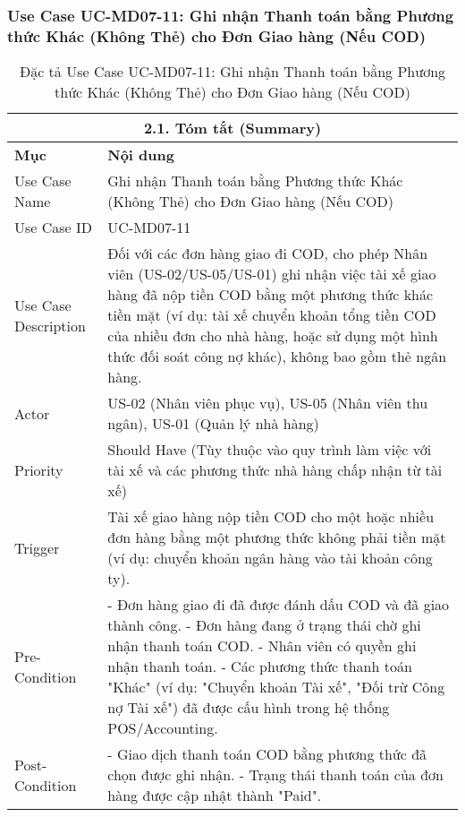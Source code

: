 \subsubsection{Use Case UC-MD07-11: Ghi nhận Thanh toán bằng Phương thức Khác (Không Thẻ) cho Đơn Giao hàng (Nếu COD)}
\begin{longtable}{|m{4cm}|p{11cm}|}
\caption{Đặc tả Use Case UC-MD07-11: Ghi nhận Thanh toán bằng Phương thức Khác (Không Thẻ) cho Đơn Giao hàng (Nếu COD)} \label{tab:uc_md07_11_final_full} \\
\hline
\multicolumn{2}{|c|}{\textbf{2.1. Tóm tắt (Summary)}} \\
\hline
\textbf{Mục} & \textbf{Nội dung} \\
\hline
\endhead %
\hline
\endfoot %
\hline
\endlastfoot %
Use Case Name & Ghi nhận Thanh toán bằng Phương thức Khác (Không Thẻ) cho Đơn Giao hàng (Nếu COD) \\
\hline
Use Case ID & UC-MD07-11 \\
\hline
Use Case Description & Đối với các đơn hàng giao đi COD, cho phép Nhân viên (US-02/US-05/US-01) ghi nhận việc tài xế giao hàng đã nộp tiền COD bằng một phương thức khác tiền mặt (ví dụ: tài xế chuyển khoản tổng tiền COD của nhiều đơn cho nhà hàng, hoặc sử dụng một hình thức đối soát công nợ khác), không bao gồm thẻ ngân hàng. \\
\hline
Actor & US-02 (Nhân viên phục vụ), US-05 (Nhân viên thu ngân), US-01 (Quản lý nhà hàng) \\
\hline
Priority & Should Have (Tùy thuộc vào quy trình làm việc với tài xế và các phương thức nhà hàng chấp nhận từ tài xế) \\
\hline
Trigger & Tài xế giao hàng nộp tiền COD cho một hoặc nhiều đơn hàng bằng một phương thức không phải tiền mặt (ví dụ: chuyển khoản ngân hàng vào tài khoản công ty). \\
\hline
Pre-Condition & - Đơn hàng giao đi đã được đánh dấu COD và đã giao thành công. \newline - Đơn hàng đang ở trạng thái chờ ghi nhận thanh toán COD. \newline - Nhân viên có quyền ghi nhận thanh toán. \newline - Các phương thức thanh toán "Khác" (ví dụ: "Chuyển khoản Tài xế", "Đối trừ Công nợ Tài xế") đã được cấu hình trong hệ thống POS/Accounting. \\
\hline
Post-Condition & - Giao dịch thanh toán COD bằng phương thức đã chọn được ghi nhận. \newline - Trạng thái thanh toán của đơn hàng được cập nhật thành "Paid". \\

\end{longtable}
